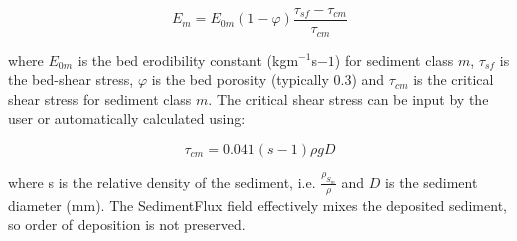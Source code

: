 \begin{equation}\label{eq:sediment_erosion_rate}
E_m = E_{0m}\left(1-\varphi\right)\frac{\tau_{sf} - \tau_{cm}}{\tau_{cm}}
\end{equation}

\noindent
where $E_{0m}$ is the bed erodibility constant (kgm$^{-1}$s${-1}$) for sediment class $m$,
$\tau_{sf}$ is the bed-shear stress, $\varphi$ is the bed porosity (typically 0.3)
and $\tau_{cm}$ is the critical shear stress
for sediment class $m$. The critical shear stress can be input by the user or 
automatically calculated using:

\begin{equation}\label{eq:sediment_erosion_rate}
\tau_{cm} = 0.041\left(s-1\right)\rho gD
\end{equation}

\noindent
where s is the relative density of the sediment, i.e. $\frac{\rho_{S_{m}}}{\rho}$ and $D$ is the sediment
diameter (mm). The SedimentFlux field effectively mixes the deposited sediment, so order of deposition
is not preserved.

